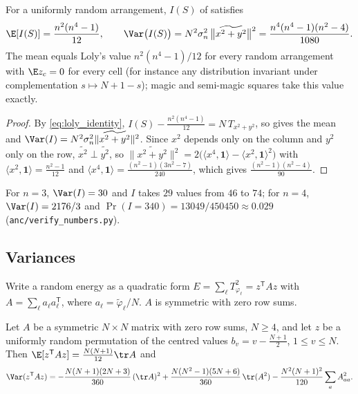 \begin{corollary}
\label{cor:loly_null}
For a uniformly random arrangement, $I(S)$ of  satisfies
\begin{equation}
\E[I(S)]=\frac{n^{2}(n^{4}-1)}{12},\qquad
\Var\bigl(I(S)\bigr)=N^{2}\sigma_n^{2}\,\bigl\|\widetilde{x^2+y^2}\bigr\|^2=\frac{n^{4}(n^{4}-1)(n^{2}-4)}{1080}.
\label{eq:loly_null}
\end{equation}
The mean equals Loly's value $n^2(n^4-1)/12$ for every random arrangement with $\E z_c=0$ for every cell (for instance any distribution invariant under complementation $s\mapsto N+1-s$); magic and semi-magic squares take this value exactly.
\end{corollary}

\begin{proof}
By \eqref{eq:loly_identity}, $I(S)-\frac{n^2(n^4-1)}{12}=N\,T_{x^2+y^2}$, so  gives the mean and $\Var(I)=N^2\sigma_n^2\|\widetilde{x^2+y^2}\|^2$.
Since $x^2$ depends only on the column and $y^2$ only on the row, $\widetilde{x^2}\perp\widetilde{y^2}$, so $\|\widetilde{x^2+y^2}\|^2=2\bigl(\langle x^4,\mathbf 1\rangle-\langle x^2,\mathbf 1\rangle^2\bigr)$ with $\langle x^2,\mathbf 1\rangle=\frac{n^2-1}{12}$ and $\langle x^4,\mathbf 1\rangle=\frac{(n^2-1)(3n^2-7)}{240}$, which gives $\frac{(n^2-1)(n^2-4)}{90}$.
\end{proof}

For $n=3$, $\Var(I)=30$ and $I$ takes $29$ values from $46$ to $74$; for $n=4$, $\Var(I)=2176/3$ and $\Pr(I=340)=13049/450450\approx0.029$ (\texttt{anc/verify\_numbers.py}).

\subsection{Variances}
\label{sec:random_var}

Write a random energy as a quadratic form $E=\sum_\ell T_{\varphi_\ell}^2=z^{\mathsf T}Az$ with $A=\sum_\ell a_\ell a_\ell^{\mathsf T}$, where $a_\ell=\tilde\varphi_\ell/N$.
$A$ is symmetric with zero row sums.

\begin{proposition}
\label{prop:var_identity}
Let $A$ be a symmetric $N\times N$ matrix with zero row sums, $N\ge4$, and let $z$ be a uniformly random permutation of the centred values $b_v=v-\frac{N+1}2$, $1\le v\le N$.  Then $\E[z^{\mathsf T}Az]=\frac{N(N+1)}{12}\tr A$ and
\begin{equation}
\Var(z^{\mathsf T}Az)=-\frac{N(N+1)(2N+3)}{360}\,(\tr A)^2+\frac{N(N^2-1)(5N+6)}{360}\,\tr(A^2)-\frac{N^2(N+1)^2}{120}\sum_aA_{aa}^2 .
\label{eq:var_identity}
\end{equation}
\end{proposition}

